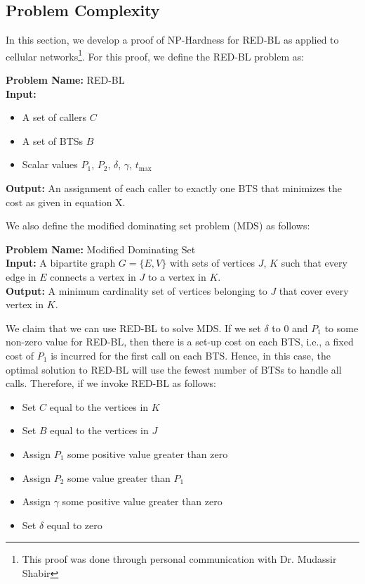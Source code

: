 \subsection{Problem Complexity}
\label{subsec:lccomplexity}
In this section, we develop a proof of NP-Hardness for RED-BL as applied to cellular networks\footnote{This proof was done through personal communication with Dr. Mudassir Shabir}. For this proof, we define the RED-BL problem as:
\medskip

\noindent
\textbf{Problem Name:} RED-BL\\
\textbf{Input:}
\begin{itemize}
\item A set of callers $C$
\item A set of BTSs $B$
\item Scalar values $P_1$, $P_2$, $\delta$, $\gamma$, $t_{\max}$
\end{itemize}
\textbf{Output:} An assignment of each caller to exactly one BTS that minimizes the cost as given in equation X.

We also define the modified dominating set problem (MDS) as follows:
\medskip

\noindent
\textbf{Problem Name:} Modified Dominating Set\\
\textbf{Input:} A bipartite graph $G=\{E,V\}$ with sets of vertices $J$, $K$ such that every edge in $E$ connects a vertex in $J$ to a vertex in $K$.\\
\textbf{Output:} A minimum cardinality set of vertices belonging to $J$ that cover every vertex in $K$.

We claim that we can use RED-BL to solve MDS. If we set $\delta$ to 0 and $P_1$ to some non-zero value for RED-BL, then there is a set-up cost on each BTS, i.e., a fixed cost of $P_1$ is incurred for the first call on each BTS. Hence, in this case, the optimal solution to RED-BL will use the fewest number of BTSs to handle all calls. Therefore, if we invoke RED-BL as follows:
\begin{itemize}
\item Set $C$ equal to the vertices in $K$
\item Set $B$ equal to the vertices in $J$
\item Assign $P_1$ some positive value greater than zero
\item Assign $P_2$ some value greater than $P_1$
\item Assign $\gamma$ some positive value greater than zero
\item Set $\delta$ equal to zero
\end{itemize}

